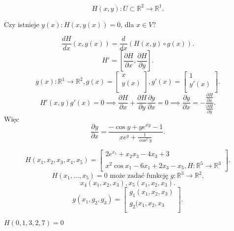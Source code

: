 \documentclass[../main.tex]{subfiles}
\begin{document}
    \begin{przyklad}
        \[
            H(x,y): U\subset\mathbb{R}^2\to\mathbb{R}^1
        .\]
    \end{przyklad}
    \begin{pytanie}
        Czy istnieje $y(x): H(x,y(x)) = 0$, dla  $x\in V$?
    \end{pytanie}
    \[
        \frac{dH}{dx}(x,y(x)) = \frac{d}{dx}(H(x,y)\circ g(x))
    .\]
    \[
        H' = \left[   \frac{\partial H}{\partial x} ,\frac{\partial H}{\partial y} \right]
    .\]
    \[
        g(x): \mathbb{R}^{1}\to\mathbb{R}^{2}, g(x) = \begin{bmatrix}
        x\\
    y(x)\\\end{bmatrix}, g'(x) = \begin{bmatrix}
1\\
y'(x)\\\end{bmatrix}
    .\]
    \[
        H'(x,y) g'(x) = 0 \implies \frac{\partial H}{\partial x} + \frac{\partial H}{\partial y} \frac{\partial y}{\partial x} =0 \implies \frac{\partial y}{\partial x} = - \frac{\frac{\partial H}{\partial x} }{\frac{\partial H}{\partial y} }
    .\]
    Więc
    \[
        \frac{\partial y}{\partial x}  = \frac{-\cos y + ye^{xy} -1}{xe^y + \frac{1}{\cos^2 y }}
    .\]
    \begin{przyklad}

    \end{przyklad}
    \[
        H(x_{1},x_{2},x_{3},x_{4},x_{5}) = \begin{bmatrix}   2e^{x_1}+x_{2}x_{3} - 4x_{3}+3\\
            x^2 \cos x_{1} - 6x_{1}+2x_{3}-x_{5}, H:\mathbb{R}^{5}\to\mathbb{R}^{3}
\end{bmatrix}
    .\]
    \[
        H(x_{1},\dots,x_{5}) = 0 \text{ może zadać funkcję }g:\mathbb{R}^{3}\to\mathbb{R}^{2}
    .\]
    \[
        x_{4}(x_{1},x_{2},x_{3}),x_{5}(x_{1},x_{2},x_{3})
    .\]
    \[
        g(x_{1},g_{2},g_{3}) = \begin{bmatrix}
        g_1(x_{1},x_{2},x_{3})\\
    g_2(x_{1},x_{2},x_{3}\\
\end{bmatrix}
    .\]

    \begin{obserwacja}
        $H(0,1,3,2,7) = 0$
    \end{obserwacja}
\end{document}
